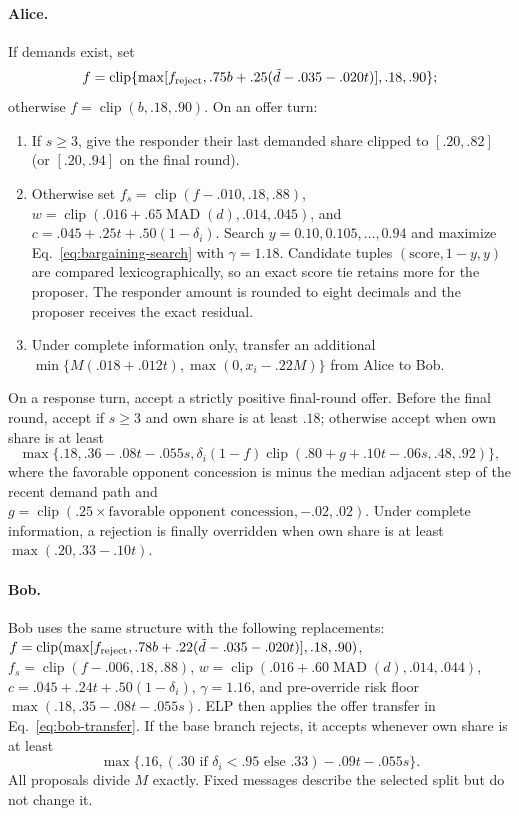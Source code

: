 \paragraph{Alice.}
If demands exist, set
\[
 f=\operatorname{clip}\{\max[f_{\rm reject},
 .75b+.25(\tilde d-.035-.020t)],.18,.90\};
\]
otherwise $f=\operatorname{clip}(b,.18,.90)$. On an offer turn:
\begin{enumerate}
 \item If $s\ge3$, give the responder their last demanded share clipped to
 $[.20,.82]$ (or $[.20,.94]$ on the final round).
 \item Otherwise set $f_s=\operatorname{clip}(f-.010,.18,.88)$,
 $w=\operatorname{clip}(.016+.65\operatorname{MAD}(d),.014,.045)$, and
 $c=.045+.25t+.50(1-\delta_i)$. Search
 $y=0.10,0.105,\ldots,0.94$ and maximize Eq.~\ref{eq:bargaining-search}
 with $\gamma=1.18$. Candidate tuples $(\text{score},1-y,y)$ are compared
 lexicographically, so an exact score tie retains more for the proposer. The
 responder amount is rounded to eight decimals and the proposer receives the
 exact residual.
 \item Under complete information only, transfer an additional
 $\min\{M(.018+.012t),\max(0,x_i-.22M)\}$ from Alice to Bob.
\end{enumerate}
On a response turn, accept a strictly positive final-round offer. Before the
final round, accept if $s\ge3$ and own share is at least $.18$; otherwise accept
when own share is at least
\[
 \max\{.18,.36-.08t-.055s,
 \delta_i(1-f)\operatorname{clip}(.80+g+.10t-.06s,.48,.92)\},
\]
where the favorable opponent concession is minus the median adjacent step of
the recent demand path and
$g=\operatorname{clip}(.25\times\text{favorable opponent concession},
-.02,.02)$. Under complete information, a rejection is finally overridden
when own share is at least $\max(.20,.33-.10t)$.

\paragraph{Bob.}
Bob uses the same structure with the following replacements:
$f=\operatorname{clip}(\max[f_{\rm reject},.78b+.22(\tilde d-.035-.020t)],.18,.90)$,
$f_s=\operatorname{clip}(f-.006,.18,.88)$,
$w=\operatorname{clip}(.016+.60\operatorname{MAD}(d),.014,.044)$,
$c=.045+.24t+.50(1-\delta_i)$, $\gamma=1.16$, and pre-override risk floor
$\max(.18,.35-.08t-.055s)$. ELP then applies the offer transfer in
Eq.~\ref{eq:bob-transfer}. If the base branch rejects, it accepts whenever own
share is at least
\[
 \max\{.16,(.30\text{ if }\delta_i<.95\text{ else }.33)-.09t-.055s\}.
\]
All proposals divide $M$ exactly. Fixed messages describe the selected split
but do not change it.

